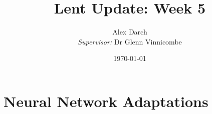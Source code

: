 \documentclass[11.7pt]{article}
\author{Alex Darch \\
   \textit{Supervisor:} Dr Glenn Vinnicombe}
\title{Lent Update: Week 5}
\date{\today}
\begin{document}
%

\maketitle

\section{Neural Network Adaptations}

\end{document}
